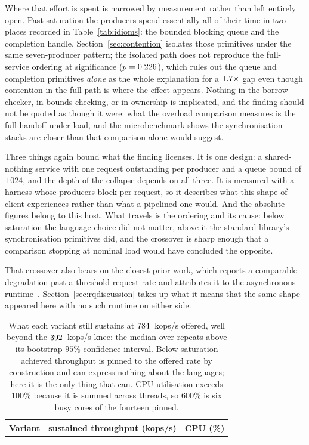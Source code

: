\documentclass[english,twoside,openright,a4paper,censored,csm,software-track-2020]{HYthesisML}
\begin{document}
Where that effort is spent is narrowed by measurement rather than left entirely open. Past
saturation the producers spend essentially all of their time in two places recorded in
Table~\ref{tab:idioms}: the bounded blocking queue and the completion handle. Section~\ref{sec:contention}
isolates those primitives under the same seven-producer pattern; the isolated path does not
reproduce the full-service ordering at significance ($p = 0.226$), which rules out the
queue and completion primitives \emph{alone} as the whole explanation for a
$1.7\times$ gap even though contention in the full path is where the effect appears.
Nothing in the borrow checker, in bounds checking, or in ownership is implicated, and the finding
should not be quoted as though it were: what the overload comparison measures is the full
handoff under load, and the microbenchmark shows the synchronisation stacks are closer than that
comparison alone would suggest.

Three things again bound what the finding licenses. It is one design: a shared-nothing service with one
request outstanding per producer and a queue bound of $1\,024$, and the depth of the collapse
depends on all three. It is measured with a harness whose producers block per request, so it
describes what this shape of client experiences rather than what a pipelined one would.
And the absolute figures belong to this host. What travels is the ordering and its cause: below
saturation the language choice did not matter, above it the standard library's synchronisation
primitives did, and the crossover is sharp enough that a comparison stopping at nominal load
would have concluded the opposite.

That crossover also bears on the closest prior work, which reports a comparable degradation past
a threshold request rate and attributes it to the asynchronous
runtime~\cite{arvidsson2025async}. Section~\ref{sec:rqdiscussion} takes up what it means that the
same shape appeared here with no such runtime on either side.

\begin{table}
\centering
\small
\caption[What each variant sustains past saturation]{What each variant still sustains at
$784$~kops/s offered, well beyond the $392$~kops/s knee: the median over
\NRepeats{} repeats above its bootstrap $95\%$ confidence interval. Below saturation achieved
throughput is pinned to the offered rate by construction and can express nothing about the
languages; here it is the only thing that can. CPU utilisation exceeds $100\%$ because it is
summed across threads, so $600\%$ is six busy cores of the fourteen
pinned.\label{tab:overload}}
\begin{tabular}{@{}l r r@{}}
\hline\hline
Variant & sustained throughput (kops/s) & CPU (\%) \\
\hline
\\
\hline
\end{tabular}
\end{table}
\end{document}
